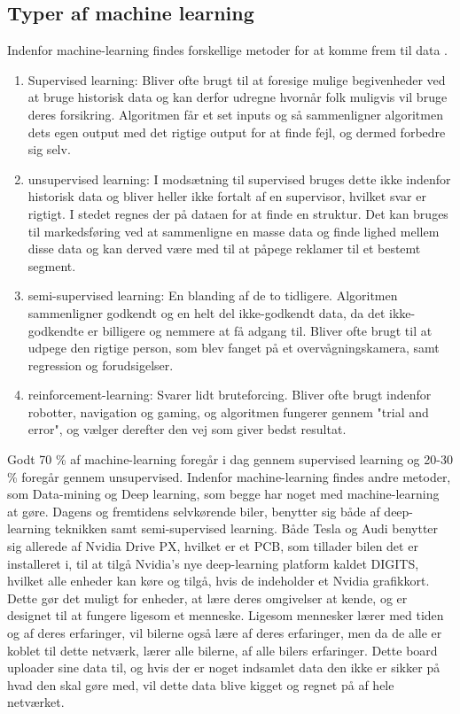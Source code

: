 \subsection{Typer af machine learning}
Indenfor machine-learning findes forskellige metoder for at komme frem til data \cite{MachineLearning}. 
	\begin{enumerate}
		\item Supervised learning: 	Bliver ofte brugt til at foresige mulige begivenheder ved at bruge historisk data og kan derfor udregne hvornår folk muligvis vil bruge deres forsikring. Algoritmen får et set inputs og så sammenligner algoritmen dets egen output med det rigtige output for at finde fejl, og dermed forbedre sig selv.
		\item unsupervised learning: I modsætning til supervised bruges dette ikke indenfor historisk data og bliver heller ikke fortalt af en supervisor, hvilket svar er rigtigt. I stedet regnes der på dataen for at finde en struktur. Det kan bruges til markedsføring ved at sammenligne en masse data og finde lighed mellem disse data og kan derved være med til at påpege reklamer til et bestemt segment.
		\item semi-supervised learning: En blanding af de to tidligere. Algoritmen sammenligner godkendt og en helt del ikke-godkendt data, da det ikke-godkendte er billigere og nemmere at få adgang til. Bliver ofte brugt til at udpege den rigtige person, som blev fanget på et overvågningskamera, samt regression og forudsigelser.
		\item reinforcement-learning: Svarer lidt bruteforcing. Bliver ofte brugt indenfor robotter, navigation og gaming, og algoritmen fungerer gennem "trial and error", og vælger derefter den vej som giver bedst resultat.
	\end{enumerate}
Godt 70 \% af machine-learning foregår i dag gennem supervised learning og 20-30 \% foregår gennem unsupervised. Indenfor machine-learning findes andre metoder, som Data-mining og Deep learning, som begge har noget med machine-learning at gøre. Dagens og fremtidens selvkørende biler, benytter sig både af deep-learning teknikken samt semi-supervised learning\cite{Musk}. Både Tesla og Audi benytter sig allerede af Nvidia Drive PX, hvilket er et PCB, som tillader bilen det er installeret i, til at tilgå Nvidia's nye deep-learning platform kaldet DIGITS, hvilket alle enheder kan køre og tilgå, hvis de indeholder et Nvidia grafikkort. Dette gør det muligt for enheder, at lære deres omgivelser at kende, og er designet til at fungere ligesom et menneske. Ligesom mennesker lærer med tiden og af deres erfaringer, vil bilerne også lære af deres erfaringer, men da de alle er koblet til dette netværk, lærer alle bilerne, af alle bilers erfaringer\cite{Nvidia}. Dette board uploader sine data til, og hvis der er noget indsamlet data den ikke er sikker på hvad den skal gøre med, vil dette data blive kigget og regnet på af hele netværket.